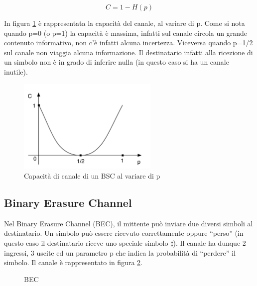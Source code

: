 \[
 C=1-H(p)
\]

In figura \ref{fig:cbsc} è rappresentata la capacità del canale, al variare di p.
Come si nota quando p=0 (o p=1) la capacità è massima, infatti sul canale circola un grande contenuto informativo, non c'è infatti 
alcuna incertezza. Viceversa quando p=1/2 sul canale non viaggia alcuna informazione. Il destinatario infatti alla ricezione di un simbolo non è in grado di inferire nulla (in questo caso si ha un canale inutile).

\begin{figure}[htbp]
\begin{center}
	\includegraphics[width=0.6\textwidth]{img/cbsc.pdf}
\caption{Capacità di canale di un BSC al variare di p}
\label{fig:cbsc}
\end{center}
\end{figure}

\newpage

\subsection{Binary Erasure Channel}
Nel Binary Erasure Channel (BEC), il mittente può inviare due diversi simboli al destinatario. Un simbolo può essere ricevuto 
correttamente oppure ``perso'' (in questo caso il destinatario riceve uno speciale simbolo $\sharp$). Il canale ha dunque 2 ingressi, 3 uscite 
ed un parametro p che indica la probabilità di ``perdere'' il simbolo. Il canale è rappresentato in figura \ref{fig:bec}.

\begin{figure}[htbp]
  \centering
  \hspace{1cm}
  \caption{BEC}
  \label{fig:bec}
\end{figure}

